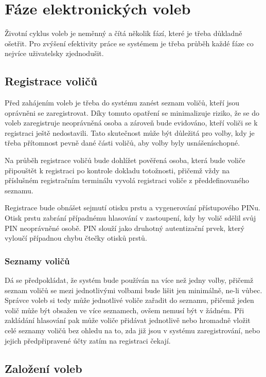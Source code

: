 \documentclass[11pt,twoside,a4paper]{book}
\begin{document}
\section{Fáze elektronických voleb}

Životní cyklus voleb je neměnný a čítá několik fází, které je třeba důkladně ošetřit. Pro zvýšení efektivity práce se systémem je třeba průběh každé fáze co nejvíce uživatelsky zjednodušit.

\subsection{Registrace voličů}

Před zahájením voleb je třeba do systému zanést seznam voličů, kteří jsou oprávněni se zaregistrovat. Díky tomuto opatření se minimalizuje riziko, že se do voleb zaregistruje neoprávněná osoba a zároveň bude evidováno, kteří voliči se k registraci ještě nedostavili. Tato skutečnost může být důležitá pro volby, kdy je třeba přítomnost pevně dané části voličů, aby volby byly usnášeníschopné.  

Na průběh registrace voličů bude dohlížet pověřená osoba, která bude voliče připouštět k registraci po kontrole dokladu totožnosti, přičemž vždy na příslušném registračním terminálu vyvolá registraci voliče z předdefinovaného seznamu.

Registrace bude obnášet sejmutí otisku prstu a vygenerování přístupového PINu. Otisk prstu zabrání případnému hlasování v zastoupení, kdy by volič sdělil svůj PIN neoprávněné osobě. PIN slouží jako druhotný autentizační prvek, který vyloučí případnou chybu čtečky otisků prstů. 

\subsubsection{Seznamy voličů} \label{sec:seznamy}

Dá se předpokládat, že systém bude používán na více než jedny volby, přičemž seznam voličů se mezi jednotlivými volbami bude lišit jen minimálně, ne-li vůbec. Správce voleb si tedy může jednotlivé voliče zařadit do seznamu, přičemž jeden volič může být obsažen ve více seznamech, ovšem nemusí být v žádném. Při zakládání hlasování pak může voliče přidávat jednotlivě nebo hromadně vložit celé seznamy voličů bez ohledu na to, zda již jsou v systému zaregistrování, nebo jejich předpřipravené účty zatím na registraci čekají.

\subsection{Založení voleb}
\end{document}

